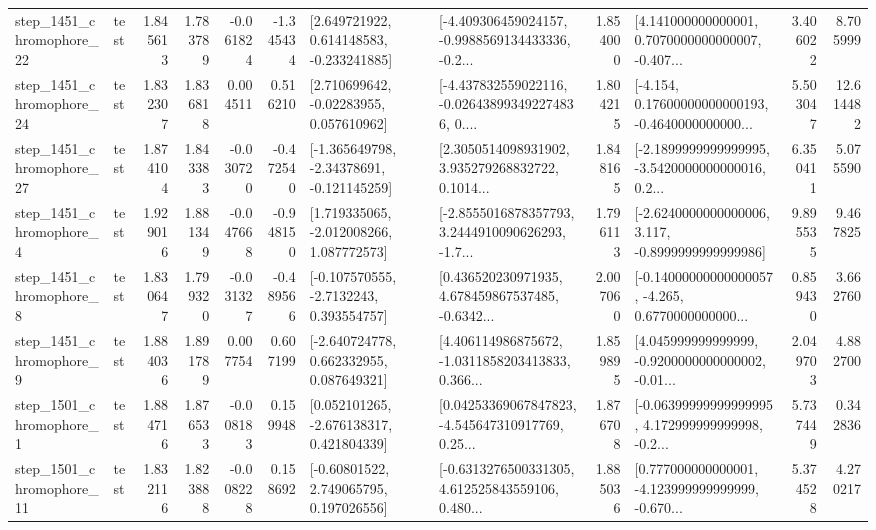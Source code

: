 \begin{tabular}{llrrrrllrlrr}
 step\_1451\_chromophore\_22 &      test &      1.845613 &    1.783789 &     -0.061824 & -1.345434 &    [2.649721922, 0.614148583, -0.233241885] &  [-4.409306459024157, -0.9988569134433336, -0.2... &       1.854000 &  [4.141000000000001, 0.7070000000000007, -0.407... &            3.406022 &          8.705999 \\
 step\_1451\_chromophore\_24 &      test &      1.832307 &    1.836818 &      0.004511 &  0.516210 &     [2.710699642, -0.02283955, 0.057610962] &  [-4.437832559022116, -0.026438993492274836, 0.... &       1.804215 &  [-4.154, 0.17600000000000193, -0.4640000000000... &            5.503047 &         12.614482 \\
 step\_1451\_chromophore\_27 &      test &      1.874104 &    1.843383 &     -0.030720 & -0.472540 &   [-1.365649798, -2.34378691, -0.121145259] &  [2.3050514098931902, 3.935279268832722, 0.1014... &       1.848165 &  [-2.1899999999999995, -3.5420000000000016, 0.2... &            6.350411 &          5.075590 \\
  step\_1451\_chromophore\_4 &      test &      1.929016 &    1.881349 &     -0.047668 & -0.948150 &    [1.719335065, -2.012008266, 1.087772573] &  [-2.8555016878357793, 3.2444910090626293, -1.7... &       1.796113 &  [-2.6240000000000006, 3.117, -0.8999999999999986] &            9.895535 &          9.467825 \\
  step\_1451\_chromophore\_8 &      test &      1.830647 &    1.799320 &     -0.031327 & -0.489566 &     [-0.107570555, -2.7132243, 0.393554757] &  [0.436520230971935, 4.678459867537485, -0.6342... &       2.007060 &  [-0.14000000000000057, -4.265, 0.6770000000000... &            0.859430 &          3.662760 \\
  step\_1451\_chromophore\_9 &      test &      1.884036 &    1.891789 &      0.007754 &  0.607199 &    [-2.640724778, 0.662332955, 0.087649321] &  [4.406114986875672, -1.0311858203413833, 0.366... &       1.859895 &  [4.045999999999999, -0.9200000000000002, -0.01... &            2.049703 &          4.882700 \\
  step\_1501\_chromophore\_1 &      test &      1.884716 &    1.876533 &     -0.008183 &  0.159948 &    [0.052101265, -2.676138317, 0.421804339] &  [0.04253369067847823, -4.545647310917769, 0.25... &       1.876708 &  [-0.06399999999999995, 4.172999999999998, -0.2... &            5.737449 &          0.342836 \\
 step\_1501\_chromophore\_11 &      test &      1.832116 &    1.823888 &     -0.008228 &  0.158692 &     [-0.60801522, 2.749065795, 0.197026556] &  [-0.6313276500331305, 4.612525843559106, 0.480... &       1.885036 &  [0.777000000000001, -4.123999999999999, -0.670... &            5.374528 &          4.270217 \\

\end{tabular}
